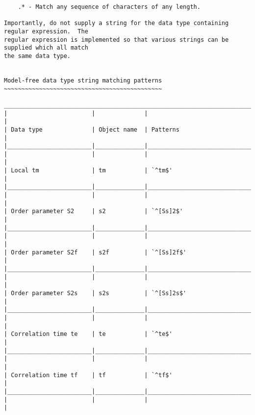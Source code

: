 {\begin{verbatim}
    .* - Match any sequence of characters of any length.

Importantly, do not supply a string for the data type containing regular expression.  The
regular expression is implemented so that various strings can be supplied which all match
the same data type.


Model-free data type string matching patterns
~~~~~~~~~~~~~~~~~~~~~~~~~~~~~~~~~~~~~~~~~~~~~

____________________________________________________________________________________________
|                        |              |                                                  |
| Data type              | Object name  | Patterns                                         |
|________________________|______________|__________________________________________________|
|                        |              |                                                  |
| Local tm               | tm           | `^tm$'                                           |
|________________________|______________|__________________________________________________|
|                        |              |                                                  |
| Order parameter S2     | s2           | `^[Ss]2$'                                        |
|________________________|______________|__________________________________________________|
|                        |              |                                                  |
| Order parameter S2f    | s2f          | `^[Ss]2f$'                                       |
|________________________|______________|__________________________________________________|
|                        |              |                                                  |
| Order parameter S2s    | s2s          | `^[Ss]2s$'                                       |
|________________________|______________|__________________________________________________|
|                        |              |                                                  |
| Correlation time te    | te           | `^te$'                                           |
|________________________|______________|__________________________________________________|
|                        |              |                                                  |
| Correlation time tf    | tf           | `^tf$'                                           |
|________________________|______________|__________________________________________________|
|                        |              |                                                  |

\end{verbatim}}
